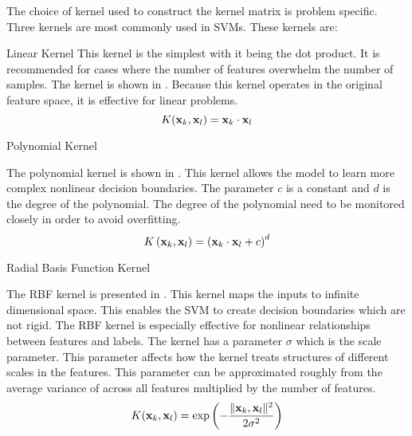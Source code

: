 The choice of kernel used to construct the kernel matrix is problem specific. Three kernels are most commonly used in SVMs. These kernels are:
\begin{numdesc}
  \item[Linear Kernel]
  This kernel is the simplest with it being the dot product. It is recommended for cases where the number of features overwhelm the number of samples. The kernel is shown in . Because this kernel operates in the original feature space, it is effective for linear problems.
  \begin{equation}
    K(\vb{x}_k,\vb{x}_l) = \vb{x}_k\cdot\vb{x}_l\label{eq:linear_kernel}
  \end{equation}
  \item[Polynomial Kernel]

  The polynomial kernel is shown in . This kernel allows the model to learn more complex nonlinear decision boundaries. The parameter \(c\) is a constant and \(d\) is the degree of the polynomial. The degree of the polynomial need to be monitored closely in order to avoid overfitting.
  \begin{equation}
    K\left(\vb{x}_k,\vb{x}_l\right) = {\left(\vb{x}_k\cdot\vb{x}_l+c\right)}^{d} \label{eq:poly_kernel}
  \end{equation}
  \item[Radial Basis Function Kernel]

  The RBF kernel is presented in . This kernel maps the inputs to infinite dimensional space. This enables the SVM to create decision boundaries which are not rigid. The RBF kernel is especially effective for nonlinear relationships between features and labels. The kernel has a parameter \(\sigma \) which is the scale parameter. This parameter affects how the kernel treats structures of different scales in the features. This parameter can be approximated roughly from the average variance of across all features multiplied by the number of features.
  \begin{equation}
    K(\vb{x}_k,\vb{x}_l) = \exp\left(-\frac{\lVert\vb{x}_k,\vb{x}_l\rVert^2}{2\sigma^2}\right) \label{eq:rbf_kernel}
  \end{equation}
\end{numdesc}

